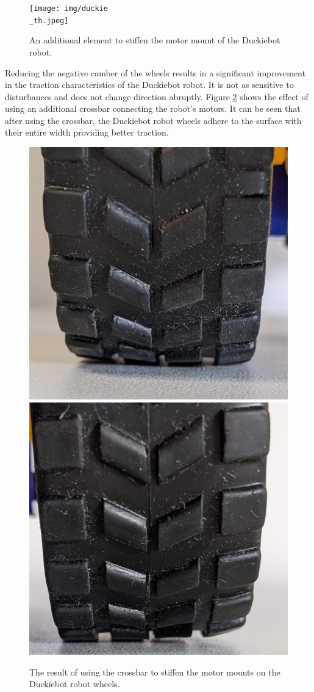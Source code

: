 \documentclass[conference]{IEEEtran}
\begin{document}
\begin{figure}[ht!]
    \centering
    \texttt{[image: img/duckie\\\_th.jpeg]}
    \caption{An additional element to stiffen the motor mount of the Duckiebot robot.}
    \label{fig:stiffening-element}
\end{figure}

Reducing the negative camber of the wheels results in a significant improvement in the traction characteristics of the Duckiebot robot. It is not as sensitive to disturbances and does not change direction abruptly. Figure \ref{fig:wheel-contact} shows the effect of using an additional crossbar connecting the robot's motors. It can be seen that after using the crossbar, the Duckiebot robot wheels adhere to the surface with their entire width providing better traction.

\begin{figure}[ht!]
    \centering
    \includegraphics[width=.475\columnwidth]{wheel-contact-1.jpg}
    \includegraphics[width=.475\columnwidth]{wheel-contact-2.jpg}
    \caption{The result of using the crossbar to stiffen the motor mounts on the Duckiebot robot wheels.}
    \label{fig:wheel-contact}
\end{figure}
\end{document}
